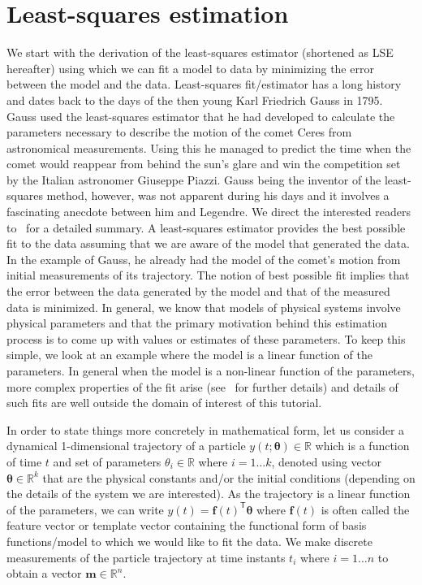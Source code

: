 \documentclass{resonance}
\def\R{\mathbb{R}}
\def\th{\bm{\theta}}
\def\f{\bm{f}}
\def\m{\bm{m}}
\def\T{\mathsf{T}}
\begin{document}
\section{Least-squares estimation} \label{sec:lse}
We start with the derivation of the least-squares estimator (shortened as LSE hereafter) using which we can fit a model to data by minimizing the error between the model and the data. Least-squares fit/estimator has a long history and dates back to the days of the then young Karl Friedrich Gauss in 1795.  Gauss used the least-squares estimator that he had developed to calculate the parameters necessary to describe the motion of the comet Ceres from astronomical measurements. Using this he managed to predict the time when the comet would reappear from behind the sun’s glare and win the competition set by the Italian astronomer Giuseppe Piazzi. Gauss being the inventor of the least-squares method, however, was not apparent during his days and it involves a fascinating anecdote between him and Legendre. We direct the interested readers to~\cite{sorenson1970least} for a detailed summary. A least-squares estimator provides the best possible fit to the data assuming that we are aware of the model that generated the data. In the example of Gauss, he already had the model of the comet's motion from initial measurements of its trajectory. The notion of best possible fit implies that the error between the data generated by the model and that of the measured data is minimized. In general, we know that models of physical systems involve physical parameters and that the primary motivation behind this estimation process is to come up with values or estimates of these parameters. To keep this simple, we look at an example where the model is a linear function of the parameters. In general when the model is a non-linear function of the parameters, more complex properties of the fit arise (see~\cite{transtrum2015perspective} for further details) and details of such fits are well outside the domain of interest of this tutorial.

In order to state things more concretely in mathematical form, let us consider a dynamical 1-dimensional trajectory of a particle $y(t; \th) \in \R$ which is a function of time $t$ and set of parameters $\theta_i \in \R$ where $i = 1\dots k$, denoted using vector $\th \in \R^k$ that are the physical constants and/or the initial conditions (depending on the details of the system we are interested). As the trajectory is a linear function of the parameters, we can write $y(t) = \f(t)^\T \th$ where $\f(t)$ is often called the feature vector or template vector containing the functional form of basis functions/model to which we would like to fit the data. We make discrete measurements of the particle trajectory at time instants $t_i$ where $i = 1\dots n$ to obtain a vector $\m \in \R^n$.
\end{document}
